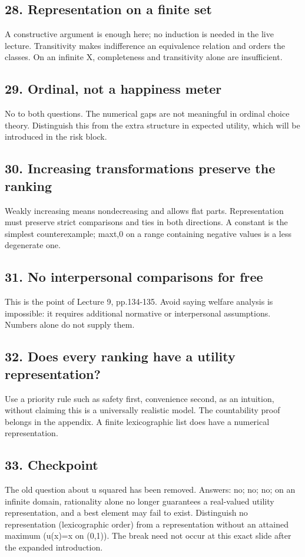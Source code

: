 \documentclass[11pt,a4paper]{article}
\begin{document}
\subsection*{28. Representation on a finite set}
A constructive argument is enough here; no induction is needed in the live lecture. Transitivity makes indifference an equivalence relation and orders the classes. On an infinite X, completeness and transitivity alone are insufficient.

\subsection*{29. Ordinal, not a happiness meter}
No to both questions. The numerical gaps are not meaningful in ordinal choice theory. Distinguish this from the extra structure in expected utility, which will be introduced in the risk block.

\subsection*{30. Increasing transformations preserve the ranking}
Weakly increasing means nondecreasing and allows flat parts. Representation must preserve strict comparisons and ties in both directions. A constant is the simplest counterexample; max{t,0} on a range containing negative values is a less degenerate one.

\subsection*{31. No interpersonal comparisons for free}
This is the point of Lecture 9, pp.134-135. Avoid saying welfare analysis is impossible: it requires additional normative or interpersonal assumptions. Numbers alone do not supply them.

\subsection*{32. Does every ranking have a utility representation?}
Use a priority rule such as safety first, convenience second, as an intuition, without claiming this is a universally realistic model. The countability proof belongs in the appendix. A finite lexicographic list does have a numerical representation.

\subsection*{33. Checkpoint}
The old question about u squared has been removed. Answers: no; no; no; on an infinite domain, rationality alone no longer guarantees a real-valued utility representation, and a best element may fail to exist. Distinguish no representation (lexicographic order) from a representation without an attained maximum (u(x)=x on (0,1)). The break need not occur at this exact slide after the expanded introduction.
\end{document}
